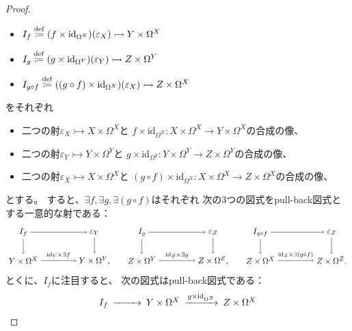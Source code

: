 \documentclass[uplatex]{jsarticle}
\theoremstyle{definition}
\def\ep{\varepsilon}
\def\id{\mathrm{id}}
\newcommand{\rtot}{\rightarrowtail}
\newcommand{\dfn}{\overset{\mathrm{\tiny def}}{\coloneqq}}
\begin{document}
\begin{proof}
  \begin{itemize}
    \item
    \(I_f \dfn (f \times \id_{\Omega^X})(\ep_X) \rtot Y\times \Omega^X\)
    \item
    \(I_g \dfn (g \times \id_{\Omega^Y})(\ep_Y) \rtot Z\times \Omega^Y\)
    \item
    \(I_{g\circ f} \dfn ((g\circ f) \times \id_{\Omega^X})(\ep_X) \rtot Z\times \Omega^X\)
  \end{itemize}
  をそれぞれ
  \begin{itemize}
    \item
    二つの射\(\ep_X \rtot X\times \Omega^X\)と
    \(f \times \id_{\Omega^X}: X\times \Omega^X \to Y\times \Omega^X\)の合成の像、
    \item
    二つの射\(\ep_Y \rtot Y\times \Omega^Y\)と
    \(g \times \id_{\Omega^Y}: Y\times \Omega^Y \to Z\times \Omega^Y\)の合成の像、
    \item
    二つの射\(\ep_X \rtot X\times \Omega^X\)と
    \((g\circ f) \times \id_{\Omega^X}: X\times \Omega^X \to Z\times \Omega^X\)の合成の像、
  \end{itemize}
  とする。
  すると、\(\exists f, \exists g, \exists (g\circ f)\)はそれぞれ
  次の3つの図式をpull-back図式とする一意的な射である：
  \[
  \begin{tikzpicture}[auto]
    \node (A) at (0,1.2) {\(I_f\)};
    \node (B) at (3,1.2) {\(\ep_Y\)};
    \node (C) at (5,1.2) {\(I_g\)};
    \node (D) at (8,1.2) {\(\ep_Z\)};
    \node (E) at (10,1.2) {\(I_{g\circ f}\)};
    \node (F) at (13,1.2) {\(\ep_Z\)};
    \node (A') at (0,0) {\(Y\times \Omega^X\)};
    \node (B') at (3,0) {\(Y\times \Omega^Y,\)};
    \node (C') at (5,0) {\(Z\times \Omega^Y\)};
    \node (D') at (8,0) {\(Z\times \Omega^Z,\)};
    \node (E') at (10,0) {\(Z\times \Omega^X\)};
    \node (F') at (13,0) {\(Z\times \Omega^Z.\)};
    \draw[->] (A) to (B);
    \draw[->] (C) to (D);
    \draw[->] (E) to (F);
    \draw[->] (A') to node {\(\scriptstyle \id_Y\times \exists f\)} (B');
    \draw[->] (C') to node {\(\scriptstyle \id_Z\times \exists g\)} (D');
    \draw[->] (E') to node {\(\scriptstyle \id_Z\times \exists (g\circ f)\)} (F');
    \draw[->] (A) to (A');
    \draw[->] (B) to (B');
    \draw[->] (C) to (C');
    \draw[->] (D) to (D');
    \draw[->] (E) to (E');
    \draw[->] (F) to (F');
  \end{tikzpicture}
  \]
  とくに、\(I_f\)に注目すると、
  次の図式はpull-back図式である：
  \[
  \begin{CD}
    I_f @>>> Y\times \Omega^X @> g\times \id_{\Omega^X} >> Z\times \Omega^X \\

\end{CD}\]
\end{proof}
\end{document}
